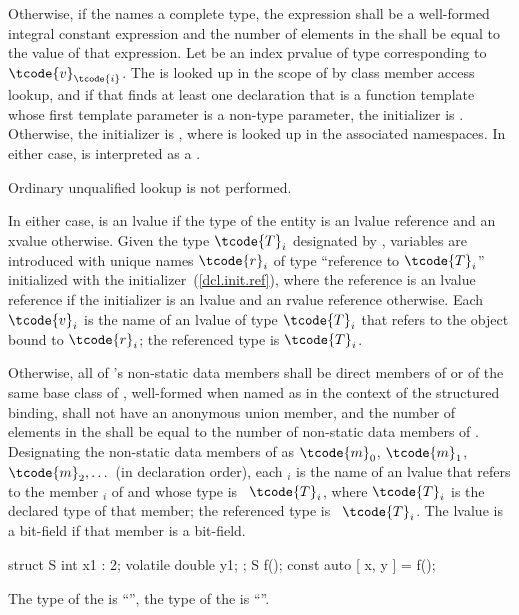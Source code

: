 \pnum
Otherwise, if
the  
names a complete type,
the expression 
shall be a well-formed integral constant expression
and
the number of elements in
the  shall be equal to the value of that
expression.
Let  be an index prvalue of type 
corresponding to $\tcode{v}_\tcode{i}$.
The   is looked up
in the scope of  by class member access lookup,
and if that finds at least one declaration
that is a function template whose first template parameter
is a non-type parameter,
the initializer is
. Otherwise, the initializer is ,
where  is looked up in the associated namespaces.
In either case,  is interpreted as a .
\begin{note}
Ordinary unqualified lookup is not performed.
\end{note}
In either case,  is an lvalue if the type of the entity 
is an lvalue reference and an xvalue otherwise. Given the type $\tcode{T}_i$
designated by ,
variables are introduced with unique names $\tcode{r}_i$
of type ``reference to $\tcode{T}_i$''
initialized with the initializer~(\ref{dcl.init.ref}),
where the reference is an lvalue reference if the initializer is
an lvalue and an rvalue reference otherwise.
Each $\tcode{v}_i$ is the name of an lvalue of type $\tcode{T}_i$
that refers to the object bound to $\tcode{r}_i$;
the referenced type is $\tcode{T}_i$.

\pnum
Otherwise,
all of 's non-static data members
shall be direct members of  or
of the same base class of ,
well-formed when named as 
in the context of the structured binding,
 shall not have an anonymous union member, and
the number of elements in the  shall be
equal to the number of non-static data members of .
Designating the non-static data members of  as
$\tcode{m}_0$, $\tcode{m}_1$, $\tcode{m}_2, \dotsc$
(in declaration order),
each $_i$ is the
name of an lvalue that refers to the member $_i$ of  and
whose type is \cv{}~$\tcode{T}_i$, where $\tcode{T}_i$ is the declared type of
that member; the referenced type is \cv{}~$\tcode{T}_i$. The lvalue is a
bit-field if that member is a bit-field.
\begin{example}
\begin{codeblock}
struct S { int x1 : 2; volatile double y1; };
S f();
const auto [ x, y ] = f();
\end{codeblock}
The type of the   is ``'',
the type of the   is ``''.
\end{example}

